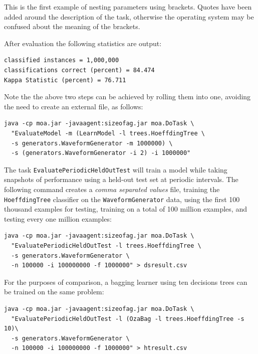 \documentclass[a4paper,12pt,twoside]{book}
\begin{document}
This is the first example of nesting parameters using brackets. Quotes have been added around the description of the task, otherwise the operating system may be confused about the meaning of the brackets.

After evaluation the following statistics are output:

\begin{footnotesize}\begin{verbatim}
classified instances = 1,000,000
classifications correct (percent) = 84.474
Kappa Statistic (percent) = 76.711
\end{verbatim}\end{footnotesize}

Note the the above two steps can be achieved by rolling them into one, avoiding the need to create an external file, as follows:

\begin{footnotesize}\begin{verbatim}
java -cp moa.jar -javaagent:sizeofag.jar moa.DoTask \
  "EvaluateModel -m (LearnModel -l trees.HoeffdingTree \
  -s generators.WaveformGenerator -m 1000000) \
  -s (generators.WaveformGenerator -i 2) -i 1000000"
\end{verbatim}\end{footnotesize}

The task \verb+EvaluatePeriodicHeldOutTest+ will train a model while taking snapshots of performance using a held-out test set at periodic intervals.
The following command creates a {\em comma separated values} file, training the \verb+HoeffdingTree+ classifier on the \verb+WaveformGenerator+ data, using the first 100 thousand examples for testing, training on a total of 100 million examples, and testing every one million examples:

\begin{footnotesize}\begin{verbatim}
java -cp moa.jar -javaagent:sizeofag.jar moa.DoTask \
  "EvaluatePeriodicHeldOutTest -l trees.HoeffdingTree \
  -s generators.WaveformGenerator \
  -n 100000 -i 100000000 -f 1000000" > dsresult.csv
\end{verbatim}\end{footnotesize}

  For the purposes of comparison, a bagging learner using ten decisions trees can be trained on
the same problem:
\begin{footnotesize}\begin{verbatim}
java -cp moa.jar -javaagent:sizeofag.jar moa.DoTask \
  "EvaluatePeriodicHeldOutTest -l (OzaBag -l trees.HoeffdingTree -s 10)\
  -s generators.WaveformGenerator \
  -n 100000 -i 100000000 -f 1000000" > htresult.csv
\end{verbatim}\end{footnotesize}
\end{document}
